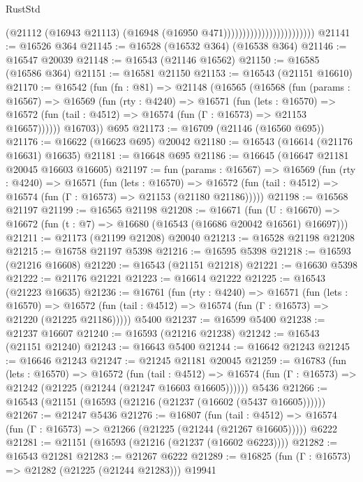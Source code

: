 \begin{lexlean}{RustStd}
\begin{coremodule}
                                              (@21112
                                                (@16943 @21113)
                                                (@16948 (@16950 @471))))))))))))))))))))))))
@21141 := @16526 @364
@21145 := @16528 (@16532 @364) (@16538 @364)
@21146 := @16547 @20039
@21148 := @16543 (@21146 @16562)
@21150 := @16585 (@16586 @364)
@21151 := @16581 @21150
@21153 := @16543 (@21151 @16610)
@21170 := @16542
    (fun (fn : @81) =>
    @21148
      (@16565
        (@16568
          (fun (params : @16567) =>
          @16569
            (fun (rty : @4240) =>
            @16571
              (fun (lets : @16570) =>
              @16572 (fun (tail : @4512) => @16574 (fun (Γ : @16573) => @21153 @16657))))))
        @16703))
    @695
@21173 := @16709 (@21146 (@16560 @695))
@21176 := @16622 (@16623 @695) @20042
@21180 := @16543 (@16614 (@21176 @16631) @16635)
@21181 := @16648 @695
@21186 := @16645 (@16647 @21181 @20045 @16603 @16605)
@21197 := fun (params : @16567) =>
  @16569
    (fun (rty : @4240) =>
    @16571
      (fun (lets : @16570) =>
      @16572 (fun (tail : @4512) => @16574 (fun (Γ : @16573) => @21153 (@21180 @21186)))))
@21198 := @16568 @21197
@21199 := @16565 @21198
@21208 := @16671
    (fun (U : @16670) => @16672 (fun (t : @7) => @16680 (@16543 (@16686 @20042 @16561) @16697)))
@21211 := @21173 (@21199 @21208) @20040
@21213 := @16528 @21198 @21208
@21215 := @16758 @21197 @5398
@21216 := @16595 @5398
@21218 := @16593 (@21216 @16608)
@21220 := @16543 (@21151 @21218)
@21221 := @16630 @5398
@21222 := @21176 @21221
@21223 := @16614 @21222
@21225 := @16543 (@21223 @16635)
@21236 := @16761
    (fun (rty : @4240) =>
    @16571
      (fun (lets : @16570) =>
      @16572 (fun (tail : @4512) => @16574 (fun (Γ : @16573) => @21220 (@21225 @21186)))))
    @5400
@21237 := @16599 @5400
@21238 := @21237 @16607
@21240 := @16593 (@21216 @21238)
@21242 := @16543 (@21151 @21240)
@21243 := @16643 @5400
@21244 := @16642 @21243
@21245 := @16646 @21243
@21247 := @21245 @21181 @20045
@21259 := @16783
    (fun (lets : @16570) =>
    @16572
      (fun (tail : @4512) =>
      @16574 (fun (Γ : @16573) => @21242 (@21225 (@21244 (@21247 @16603 @16605))))))
    @5436
@21266 := @16543 (@21151 (@16593 (@21216 (@21237 (@16602 (@5437 @16605))))))
@21267 := @21247 @5436
@21276 := @16807
    (fun (tail : @4512) => @16574 (fun (Γ : @16573) => @21266 (@21225 (@21244 (@21267 @16605)))))
    @6222
@21281 := @21151 (@16593 (@21216 (@21237 (@16602 @6223))))
@21282 := @16543 @21281
@21283 := @21267 @6222
@21289 := @16825 (fun (Γ : @16573) => @21282 (@21225 (@21244 @21283))) @19941

\end{coremodule}
\end{lexlean}
